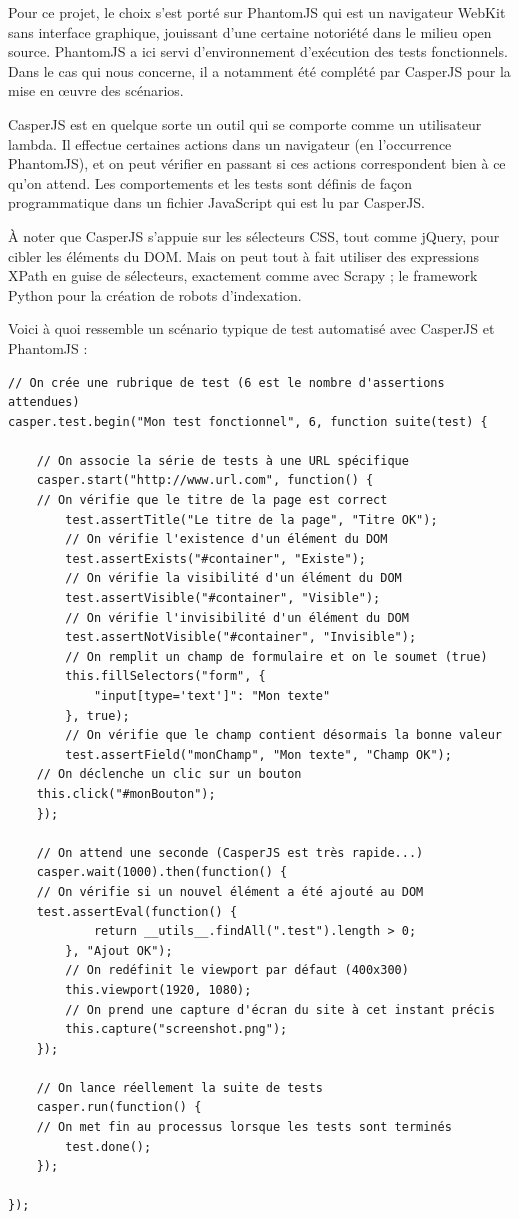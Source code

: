 \documentclass[a4paper,12pt]{article}
\begin{document}
Pour ce projet, le choix s'est porté sur PhantomJS qui est un navigateur WebKit sans interface graphique, jouissant d'une certaine notoriété dans le milieu open source. PhantomJS a ici servi d'environnement d'exécution des tests fonctionnels. Dans le cas qui nous concerne, il a notamment été complété par CasperJS pour la mise en œuvre des scénarios.

CasperJS est en quelque sorte un outil qui se comporte comme un utilisateur lambda. Il effectue certaines actions dans un navigateur (en l'occurrence PhantomJS), et on peut vérifier en passant si ces actions correspondent bien à ce qu'on attend. Les comportements et les tests sont définis de façon programmatique dans un fichier JavaScript qui est lu par CasperJS.

À noter que CasperJS s'appuie sur les sélecteurs CSS, tout comme jQuery, pour cibler les éléments du DOM. Mais on peut tout à fait utiliser des expressions XPath en guise de sélecteurs, exactement comme avec Scrapy ; le framework Python pour la création de robots d'indexation.

Voici à quoi ressemble un scénario typique de test automatisé avec CasperJS et PhantomJS :

\begin{lstlisting}
// On crée une rubrique de test (6 est le nombre d'assertions attendues)
casper.test.begin("Mon test fonctionnel", 6, function suite(test) {

    // On associe la série de tests à une URL spécifique
    casper.start("http://www.url.com", function() {
	// On vérifie que le titre de la page est correct
        test.assertTitle("Le titre de la page", "Titre OK");
        // On vérifie l'existence d'un élément du DOM
        test.assertExists("#container", "Existe");
        // On vérifie la visibilité d'un élément du DOM
        test.assertVisible("#container", "Visible");
        // On vérifie l'invisibilité d'un élément du DOM
        test.assertNotVisible("#container", "Invisible");
        // On remplit un champ de formulaire et on le soumet (true)
        this.fillSelectors("form", {
            "input[type='text']": "Mon texte"
        }, true);
        // On vérifie que le champ contient désormais la bonne valeur
        test.assertField("monChamp", "Mon texte", "Champ OK");
	// On déclenche un clic sur un bouton
	this.click("#monBouton");
    });
    
    // On attend une seconde (CasperJS est très rapide...)
    casper.wait(1000).then(function() {
	// On vérifie si un nouvel élément a été ajouté au DOM
	test.assertEval(function() {
            return __utils__.findAll(".test").length > 0;
        }, "Ajout OK");
        // On redéfinit le viewport par défaut (400x300)
        this.viewport(1920, 1080);
        // On prend une capture d'écran du site à cet instant précis
        this.capture("screenshot.png");
    });
    
    // On lance réellement la suite de tests
    casper.run(function() {
	// On met fin au processus lorsque les tests sont terminés
        test.done();
    });
    
});
\end{lstlisting}
\end{document}
